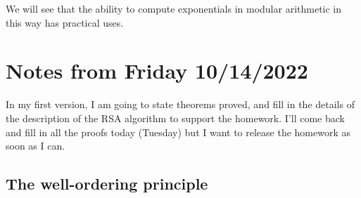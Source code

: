 \documentclass[12pt]{article}
\begin{document}
We will see that the ability to compute exponentials in modular arithmetic in this way has practical uses.



\section{Notes from Friday 10/14/2022}

In my first version, I am going to state theorems proved, and fill in the details of the description of the RSA algorithm to support the homework.  I'll come back and fill in all the proofs today (Tuesday) but I want to release the homework as soon as I can.

\subsection{The well-ordering principle}
\end{document}
